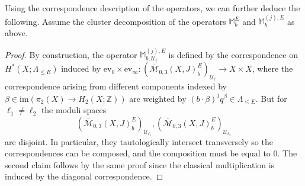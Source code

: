 \documentclass[reqno]{amsart}
\numberwithin{equation}{section}
\numberwithin{equation}{section}
\numberwithin{equation}{section}
\newtheorem{lemma}[thm]{Lemma}
\theoremstyle{definition}
\theoremstyle{remark}
\theoremstyle{remark}
\newcommand{\ov}{\overline}
\begin{document}
Using the correspondence description of the operators, we can further deduce the following. Assume the cluster decomposition of the operators $\mathbb{M}_b^E$ and $\mathbb{M}_b^{(j), E}$ as above.

\begin{proof}
    By construction, the operator $\mathbb{M}_{b, \mathcal{U}_\ell}^{(j), E}$ is defined by the correspondence on $H^*(X;\Lambda_{\le E})$ induced by
    $\mathrm{ev}_0 \times \mathrm{ev}_\infty : \left( \ov{\mathcal{M}}_{0,3}(X,J)^E_b \right)_{\mathcal{U}_\ell} \to X \times X$,
    where the correspondence arising from different components indexed by $\beta \in \mathrm{im}(\pi_2(X) \to H_2(X;\mathbb{Z}))$ are weighted by $(b \cdot \beta)^j q^\beta \in \Lambda_{\le E}$. But for $\ell_1 \neq \ell_2$ the moduli spaces
    \begin{equation}
        \left( \ov{\mathcal{M}}_{0,3}(X,J)^E_b \right)_{\mathcal{U}_{\ell_1}}, \left( \ov{\mathcal{M}}_{0,3}(X,J)^E_b \right)_{\mathcal{U}_{\ell_2}}  
    \end{equation}
    are disjoint. In particular, they tautologically intersect transversely so the correspondences can be composed, and the composition must be equal to $0$. The second claim follows by the same proof since the classical multiplication is induced by the diagonal correspondence.
\end{proof}
\end{document}
